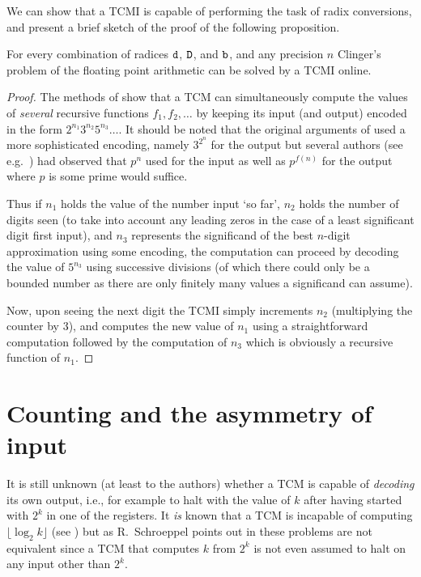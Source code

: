 \documentclass[12pt]{article}
\begin{document}
We can show that a TCMI is capable of performing the task
of radix conversions, and present a brief sketch of the proof of the
following proposition.
\begin{proposition}\label{tcmo}
For every combination of radices ${\tt d}$, ${\tt D}$, and
  ${\tt b}$, and any precision $n$
Clinger's problem of the floating point arithmetic can be solved
by a TCMI online.
\end{proposition}
\begin{proof}
The methods of \cite{Minsky} show that a TCM can simultaneously
compute the values of {\it several\/} recursive functions
$f_1,f_2,\ldots$ by keeping its input (and output) encoded in the form
$2^{n_1}3^{n_2}5^{n_3}\ldots$. It should be noted that the original
arguments of \cite{Minsky} used a more sophisticated encoding, namely $3^{2^n}$ for the output but
several authors (see e.g.~\cite{Bardz}) had observed that $p^n$ used
for the input as well as $p^{f(n)}$ for the output where $p$ is some prime would
suffice. 

Thus if $n_1$ holds the value of the
number input `so far', $n_2$ holds the number of digits seen (to take
into account any leading zeros in the case of a least significant
digit first input), and $n_3$ represents the significand
of the best $n$-digit approximation using some encoding, the
computation can proceed by decoding the value of $5^{n_3}$ using
successive divisions (of which there could only be a bounded number as
there are only finitely many values a significand can assume).

Now, upon seeing the next digit the TCMI simply increments
$n_2$ (multiplying the counter by $3$), and computes the new value of
$n_1$ using a straightforward computation followed by the computation
of $n_3$ which is obviously a recursive function of $n_1$.
\end{proof}

\section{Counting and the asymmetry of input}

It is still unknown (at least to the authors) whether a TCM is capable
of {\it decoding\/} its own output, i.e., for example to halt with the
value of $k$ after having started with $2^k$ in one of the registers.
It {\it is} known that a TCM is incapable of computing $\lfloor
\log_2k\rfloor$ (see \cite{Schroep}) but as R.~Schroeppel points out
in \cite{Schroep} these problems are not equivalent since a TCM that
computes $k$ from $2^k$ is not even assumed to halt on any input other than
$2^k$.
\end{document}
